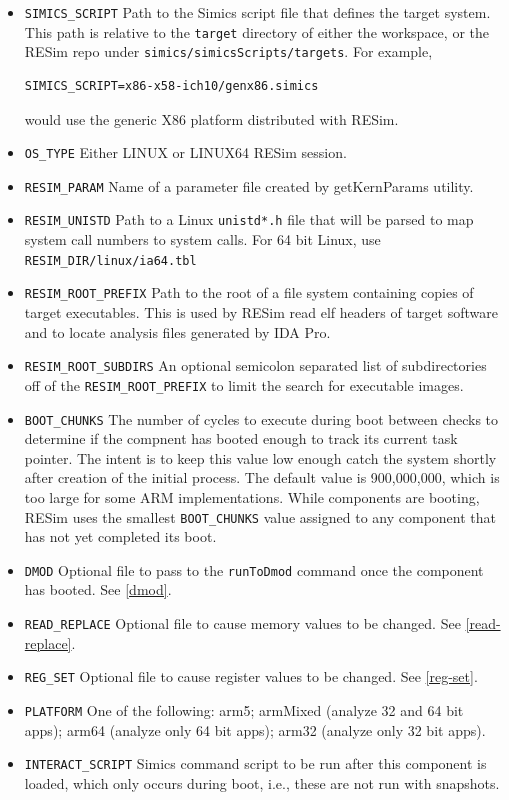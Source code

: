 \documentclass[titlepage]{article}
\begin{document}
\begin{itemize}
\item {\tt SIMICS\_SCRIPT} Path to the Simics script file that defines the target system.  This path is relative to the {\tt target} directory
of either the workspace, or the RESim repo under {\tt simics/simicsScripts/targets}.  For example, 
\begin{verbatim}
SIMICS_SCRIPT=x86-x58-ich10/genx86.simics
\end{verbatim}
\noindent would use the generic X86 platform distributed with RESim.
\item {\tt OS\_TYPE} Either LINUX or LINUX64
RESim session.
\item {\tt RESIM\_PARAM} Name of a parameter file created by getKernParams utility.
\item {\tt RESIM\_UNISTD} Path to a Linux {\tt unistd*.h} file that will be parsed to map system call numbers to system calls.  For 64 bit
Linux, use {\tt RESIM\_DIR/linux/ia64.tbl}
\item {\tt RESIM\_ROOT\_PREFIX} Path to the root of a file system containing copies of target executables.  This is used by RESim read elf
headers of target software and to locate analysis files generated by IDA Pro. 
\item {\tt RESIM\_ROOT\_SUBDIRS} An optional semicolon separated list of subdirectories off of the {\tt RESIM\_ROOT\_PREFIX} to limit the 
search for executable images.
\item {\tt BOOT\_CHUNKS} The number of cycles to execute during boot between checks to determine if the compnent has booted enough to track
its current task pointer.  The intent is to keep this value low enough catch the system shortly after creation of the initial process.
The default value is 900,000,000, which is too large for some ARM implementations.  While components are booting, RESim uses the smallest
{\tt BOOT\_CHUNKS} value assigned to any component that has not yet completed its boot.
\item {\tt DMOD} Optional file to pass to the {\tt runToDmod} command once the component has booted.  See \ref{dmod}.
\item {\tt READ\_REPLACE} Optional file to cause memory values to be changed.  See \ref{read-replace}.
\item {\tt REG\_SET} Optional file to cause register values to be changed.  See \ref{reg-set}.
\item {\tt PLATFORM} One of the following: arm5; armMixed (analyze 32 and 64 bit apps); arm64 (analyze only 64 bit apps); arm32 (analyze only 32 bit apps).
\item {\tt INTERACT\_SCRIPT} Simics command script to be run after this component is loaded, which only occurs during boot, i.e., these are not run with snapshots.

\end{itemize}
\end{document}
